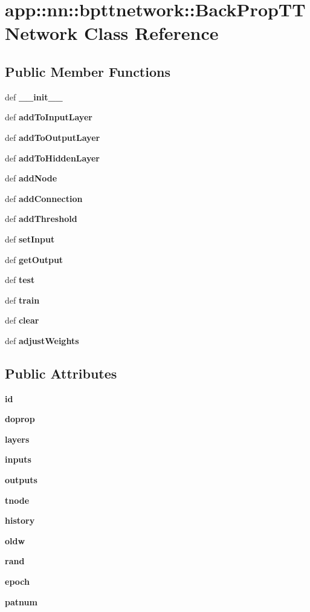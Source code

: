 \section{app::nn::bpttnetwork::BackPropTTNetwork Class Reference}
\label{classapp_1_1nn_1_1bpttnetwork_1_1BackPropTTNetwork}
\subsection*{Public Member Functions}
\begin{CompactItemize}
\item 
def {\bf \_\-\_\-init\_\-\_\-}
\item 
def {\bf addToInputLayer}
\item 
def {\bf addToOutputLayer}
\item 
def {\bf addToHiddenLayer}
\item 
def {\bf addNode}
\item 
def {\bf addConnection}
\item 
def {\bf addThreshold}
\item 
def {\bf setInput}
\item 
def {\bf getOutput}
\item 
def {\bf test}
\item 
def {\bf train}
\item 
def {\bf clear}
\item 
def {\bf adjustWeights}
\end{CompactItemize}
\subsection*{Public Attributes}
\begin{CompactItemize}
\item 
{\bf id}
\item 
{\bf doprop}
\item 
{\bf layers}
\item 
{\bf inputs}
\item 
{\bf outputs}
\item 
{\bf tnode}
\item 
{\bf history}
\item 
{\bf oldw}
\item 
{\bf rand}
\item 
{\bf epoch}
\item 
{\bf patnum}
\end{CompactItemize}



